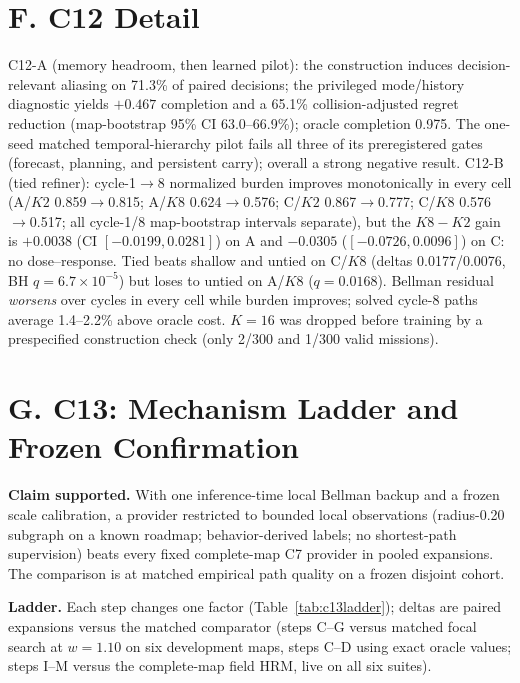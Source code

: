 \documentclass[letterpaper]{article} %
\newcommand{\stage}[1]{\textsc{#1}}
\begin{document}
\section{F. \stage{C12} Detail}

\stage{C12-A} (memory headroom, then learned pilot): the construction induces decision-relevant aliasing on 71.3\% of paired decisions; the privileged mode/history diagnostic yields $+0.467$ completion and a 65.1\% collision-adjusted regret reduction (map-bootstrap 95\% CI 63.0--66.9\%); oracle completion 0.975. The one-seed matched temporal-hierarchy pilot fails all three of its preregistered gates (forecast, planning, and persistent carry); overall a strong negative result. \stage{C12-B} (tied refiner): cycle-1$\to$8 normalized burden improves monotonically in every cell (A/$K2$ 0.859$\to$0.815; A/$K8$ 0.624$\to$0.576; C/$K2$ 0.867$\to$0.777; C/$K8$ 0.576$\to$0.517; all cycle-1/8 map-bootstrap intervals separate), but the $K8{-}K2$ gain is $+0.0038$ (CI $[-0.0199, 0.0281]$) on A and $-0.0305$ ($[-0.0726, 0.0096]$) on C: no dose--response. Tied beats shallow and untied on C/$K8$ (deltas 0.0177/0.0076, BH $q{=}6.7{\times}10^{-5}$) but loses to untied on A/$K8$ ($q{=}0.0168$). Bellman residual \emph{worsens} over cycles in every cell while burden improves; solved cycle-8 paths average 1.4--2.2\% above oracle cost. $K{=}16$ was dropped before training by a prespecified construction check (only 2/300 and 1/300 valid missions).

\section{G. C13: Mechanism Ladder and Frozen Confirmation}

\textbf{Claim supported.} With one inference-time local Bellman backup and a frozen scale calibration, a provider restricted to bounded local observations (radius-0.20 subgraph on a known roadmap; behavior-derived labels; no shortest-path supervision) beats every fixed complete-map \stage{C7} provider in pooled expansions. The comparison is at matched empirical path quality on a frozen disjoint cohort.

\textbf{Ladder.} Each step changes one factor (Table~\ref{tab:c13ladder}); deltas are paired expansions versus the matched comparator (steps C--G versus matched focal search at $w{=}1.10$ on six development maps, steps C--D using exact oracle values; steps I--M versus the complete-map field HRM, live on all six suites).
\end{document}
